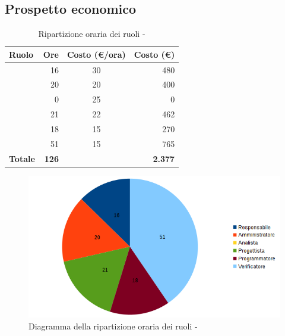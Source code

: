 \documentclass[12pt,a4paper]{article}
\begin{document}
\subsection{Prospetto economico}

\begin{table}[H]
	\begin{center}
		\begin{tabular}{l r c r}
			\toprule
			\textbf{Ruolo}	& \textbf{Ore} & \textbf{Costo (\euro/ora)}	& \textbf{Costo (\euro)} \\
			\midrule
			\midrule
			\RE & 16 & 30 & 480\\
			\midrule
			\AM & 20 & 20 & 400\\ 
			\midrule
			\AN & 0 & 25 & 0\\ 
			\midrule
			\PG & 21 & 22 & 462\\ 
			\midrule
			\PR & 18 & 15 & 270\\ 
			\midrule
			\VR & 51 & 15 & 765\\ 
			\midrule
			\textbf{Totale} & \textbf{126} &  & \textbf{2.377}\\
			\bottomrule
		\end{tabular}
		\caption{Ripartizione oraria dei ruoli - \FVV}
	\end{center}
\end{table}

\begin{center}
	\begin{figure}[H]
		\centering
		\includegraphics[width=\textwidth]{diagrammaTortaVerificaValidazioneTotaleOre.png}
		\caption{Diagramma della ripartizione oraria dei ruoli - \FVV}
	\end{figure}
\end{center}

\newpage
\end{document}
